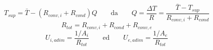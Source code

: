 \documentclass[a4paper,10pt]{article}                                                                                       %
\begin{document}
\vspace{3mm}                                                                                                                %
\begin{equation}                                                                                                            %
  T_{sup} = \bar{T}-(R_{conv,i}+R_{cond})Q                                                                                  %
  \qquad\text{da}\qquad                                                                                                     %
  Q = \frac{\Delta{T}}{R} = \frac{\bar{T}-T_{sup}}{R_{conv,i}+R_{cond}}                                                     %
  \label{eqn:surf_temp}                                                                                                     %
\end{equation}                                                                                                              %
\vspace{3mm}                                                                                                                %
\begin{equation}                                                                                                            %
  R_{tot} = R_{conv,i}+R_{cond}+R_{conv,e}                                                                                  %
  \label{eqn:tot_r}                                                                                                         %
\end{equation}                                                                                                              %
\vspace{3mm}                                                                                                                %
\begin{equation}                                                                                                            %
  U_{i,adim} = \frac{1/A_i}{R_{tot}}                                                                                        %
  \qquad\text{ed}\qquad                                                                                                     %
  U_{e,adim} = \frac{1/A_e}{R_{tot}}                                                                                        %
  \label{eqn:ohtc}                                                                                                          %
\end{equation}                                                                                                              %
\end{document}
